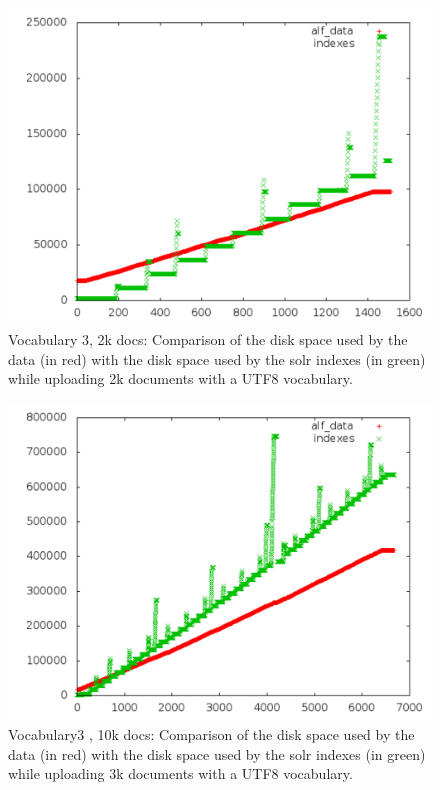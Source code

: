 \documentclass[12pt,a4]{article}
\begin{document}
\begin{figure}[h]
\begin{center}
\includegraphics[width=130mm]{out_vocab3_2kdocs}
\end{center}
\caption{Vocabulary 3, 2k docs: Comparison of the disk space used by the data (in red) with the disk space used by the solr indexes (in green) while uploading 2k documents with a UTF8 vocabulary.}
\end{figure}



\begin{figure}[h]
\begin{center}
\includegraphics[width=130mm]{out_vocab3_10kdocs}
\end{center}
\caption{Vocabulary3 , 10k docs: Comparison of the disk space used by the data (in red) with the disk space used by the solr indexes (in green) while uploading 3k documents with a UTF8 vocabulary.}
\end{figure}
\end{document}
